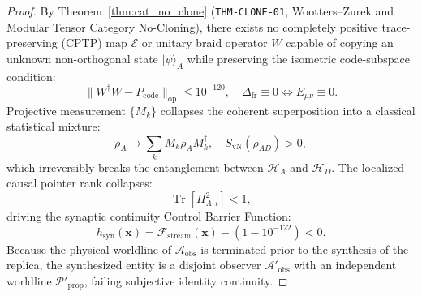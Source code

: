 \documentclass[11pt,onecolumn]{article}
\DeclareMathOperator{\Tr}{Tr}
\begin{document}
\begin{proof}
By Theorem~\ref{thm:cat_no_clone} (\texttt{THM-CLONE-01}, Wootters--Zurek and Modular Tensor Category No-Cloning), there exists no completely positive trace-preserving (CPTP) map $\mathcal{E}$ or unitary braid operator $W$ capable of copying an unknown non-orthogonal state $|\psi\rangle_A$ while preserving the isometric code-subspace condition:
\begin{equation}
\|W^\dagger W - P_{\text{code}}\|_{\text{op}} \le 10^{-120}, \quad \Delta_{\text{fr}} \equiv 0 \iff E_{\mu\nu} \equiv 0.
\end{equation}
Projective measurement $\{M_k\}$ collapses the coherent superposition into a classical statistical mixture:
\begin{equation}
\rho_A \mapsto \sum_k M_k \rho_A M_k^\dagger, \quad S_{\text{vN}}(\rho_{AD}) > 0,
\end{equation}
which irreversibly breaks the entanglement between $\mathcal{H}_A$ and $\mathcal{H}_D$. The localized causal pointer rank collapses:
\begin{equation}
\Tr\left[ \Pi_{A,\iota}^2 \right] < 1,
\end{equation}
driving the synaptic continuity Control Barrier Function:
\begin{equation}
h_{\text{syn}}(\mathbf{x}) = \mathcal{F}_{\text{stream}}(\mathbf{x}) - \left(1 - 10^{-122}\right) < 0.
\end{equation}
Because the physical worldline of $\mathcal{A}_{\text{obs}}$ is terminated prior to the synthesis of the replica, the synthesized entity is a disjoint observer $\mathcal{A}'_{\text{obs}}$ with an independent worldline $\mathcal{P}'_{\text{prop}}$, failing subjective identity continuity.
\end{proof}
\end{document}
